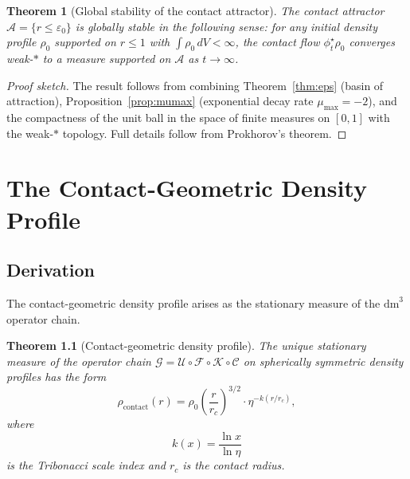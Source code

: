 \documentclass[11pt,a4paper,openright]{book}
\theoremstyle{dm3thm}
\newtheorem{theorem}{Theorem}[chapter]
\theoremstyle{dm3def}
\newcommand{\dm}{\mathrm{dm}^3}
\newcommand{\eps}{\varepsilon_0}
\newcommand{\rhocon}{\rho_{\mathrm{contact}}}
\newcommand{\rhoc}{\rho_0}
\newcommand{\rc}{r_c}
\newcommand{\etaT}{\eta}   %
\newcommand{\mumax}{\mu_{\max}}
\newcommand{\GG}{\mathcal{G}}
\newcommand{\UU}{\mathcal{U}}
\newcommand{\FF}{\mathcal{F}}
\newcommand{\KK}{\mathcal{K}}
\newcommand{\CC}{\mathcal{C}}
\begin{document}
\begin{theorem}[Global stability of the contact attractor]
\label{thm:globalstab}
The contact attractor $\mathcal{A} = \{r \leq \eps\}$ is globally stable in
the following sense: for any initial density profile $\rho_0$ supported on
$r \leq 1$ with $\int \rho_0\,dV < \infty$, the contact flow
$\phi_t^\star\rho_0$ converges weak-$*$ to a measure supported on
$\mathcal{A}$ as $t\to\infty$.
\end{theorem}

\begin{proof}[Proof sketch]
The result follows from combining Theorem~\ref{thm:eps} (basin of attraction),
Proposition~\ref{prop:mumax} (exponential decay rate $\mumax=-2$), and the
compactness of the unit ball in the space of finite measures on $[0,1]$ with
the weak-$*$ topology.  Full details follow from Prokhorov's theorem.
\end{proof}

\chapter{The Contact-Geometric Density Profile}
\label{ch:density}

\section{Derivation}

The contact-geometric density profile arises as the stationary measure of the
$\dm$ operator chain.

\begin{theorem}[Contact-geometric density profile]\label{thm:density}
The unique stationary measure of the operator chain
$\GG = \UU\circ\FF\circ\KK\circ\CC$ on spherically symmetric density profiles
has the form
\begin{equation}\label{eq:density}
  \rhocon(r) = \rhoc\!\left(\frac{r}{\rc}\right)^{3/2}
               \cdot \etaT^{-k(r/\rc)},
\end{equation}
where
\begin{equation}\label{eq:kfun}
  k(x) = \frac{\ln x}{\ln\etaT}
\end{equation}
is the \emph{Tribonacci scale index} and $\rc$ is the contact radius.
\end{theorem}
\end{document}
